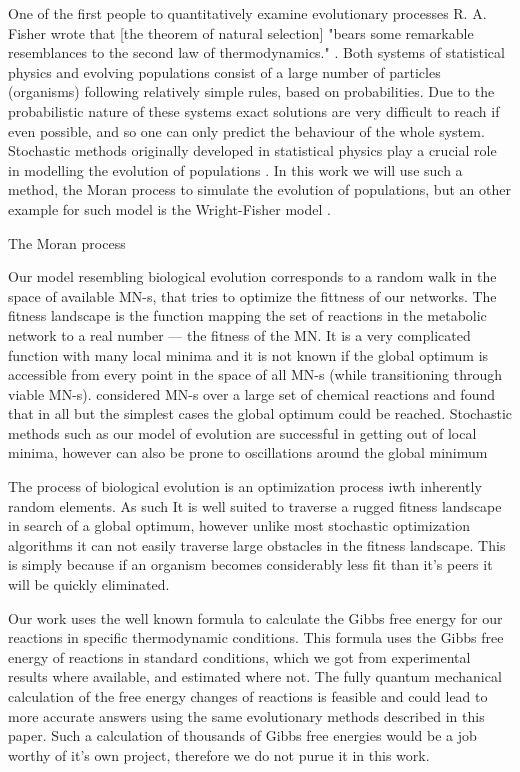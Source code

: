 \documentclass[10pt,a4paper]{article}
\begin{document}
	One of the first people to quantitatively examine evolutionary processes R. A. Fisher wrote that [the theorem of natural selection] "bears some remarkable resemblances to the second law of thermodynamics." \cite{fisherevolution}. Both systems of statistical physics and evolving populations consist of a large number of particles (organisms) following relatively simple rules, based on probabilities. Due to the probabilistic nature of these systems exact solutions are very difficult to reach if even possible, and so one can only predict the behaviour of the whole system. Stochastic methods originally developed in statistical physics play a crucial role in modelling the evolution of populations \cite{stochasticblythe}. In this work we will use such a method, the Moran process \cite{moranprocess} to simulate the evolution of populations, but an other example for such model is the Wright-Fisher model \cite{mathematicalpopgen}.


	The Moran process 

	Our model resembling biological evolution corresponds to a random walk in the space of available MN-s, that tries to optimize the fittness of our networks. The fitness landscape is the function mapping the set of reactions in the metabolic network to a real number --- the fitness of the MN.  It is a very complicated function with many local minima and it is not known if the global optimum is accessible from every point in the space of all MN-s (while transitioning through viable MN-s). \cite{historical} considered MN-s over a large set of chemical reactions and found that in all but the simplest cases the global optimum could be reached. Stochastic methods such as our model of evolution are successful in getting out of local minima, however can also be prone to oscillations around the global minimum 

	The process of biological evolution is an optimization process iwth inherently random elements. As such It is well suited to traverse a rugged fitness landscape in search of a global optimum, however unlike most stochastic optimization algorithms it can not easily traverse large obstacles in the fitness landscape. This is simply because if an organism becomes considerably less fit than it's peers it will be quickly eliminated. 

	Our work uses the well known formula to calculate the Gibbs free energy for our reactions in specific thermodynamic conditions. This formula uses the Gibbs free energy of reactions in standard conditions, which we got from experimental results where available, and estimated \cite{BartekLower} where not. The fully quantum mechanical calculation of the free energy changes of reactions is feasible and could lead to more accurate answers using the same evolutionary methods described in this paper. Such a calculation of thousands of Gibbs free energies would be a job worthy of it's own project, therefore we do not purue it in this work. 
\end{document}
